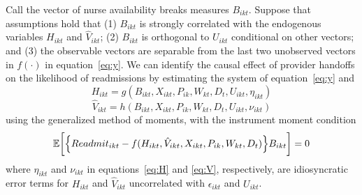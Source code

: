 \documentclass[final,12pt, notitlepage]{article}
\begin{document}
Call the vector of nurse availability breaks measures $B_{ikt}$.
Suppose that assumptions hold that (1) $B_{ikt}$ is strongly correlated with the endogenous variables $H_{ikt}$ and $\hat{V}_{ikt}$;
(2) $B_{ikt}$ is orthogonal to $U_{ikt}$ conditional on other vectors; and
(3) the observable vectors are separable from the last two unobserved vectors in $f(\cdot)$ in equation~\eqref{eq:y}.
We can identify the causal effect of provider handoffs on the likelihood of readmissions by estimating the system of equation~\eqref{eq:y} and
\begin{equation}\label{eq:H}
H_{ikt} = g( B_{ikt} , X_{ikt}, P_{ik}, W_{kt}, D_t, U_{ikt}, \eta_{ikt})
\end{equation}
 \begin{equation}\label{eq:V}
\hat{V}_{ikt} = h( B_{ikt} , X_{ikt}, P_{ik}, W_{kt}, D_t, U_{ikt}, \nu_{ikt})
\end{equation}
using the generalized method of moments, with the instrument moment condition
\begin{equation}
\mathbb{E} \bigg[ \Big\{ Readmit_{ikt} - f(H_{ikt}, \hat{V}_{ikt}, X_{ikt}, P_{ik}, W_{kt}, D_t ) \Big\} B_{ikt}  \bigg] = 0
\end{equation}
where $\eta_{ikt}$ and $\nu_{ikt}$ in equations~\eqref{eq:H} and \eqref{eq:V}, respectively, are idiosyncratic error terms for $H_{ikt}$ and $\hat{V}_{ikt}$ uncorrelated with $\epsilon_{ikt}$ and $U_{ikt}$.
\end{document}

